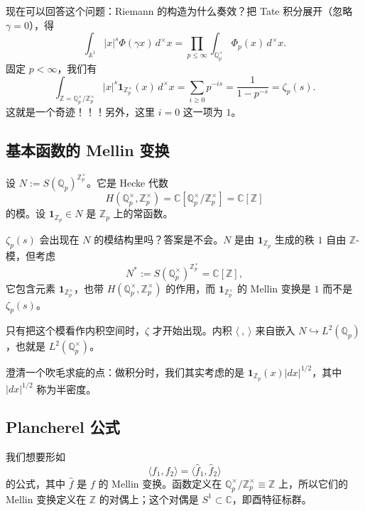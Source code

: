 现在可以回答这个问题：Riemann 的构造为什么奏效？把 Tate 积分展开（忽略 $\gamma=0$），得
\begin{equation}
  \int_{\mathbb A^1}|x|^s\Phi(\gamma x)\,d^\times x=\prod_{p\le\infty}\int_{\mathbb Q_p^\times}\Phi_p(x)\,d^\times x.
  \label{eq:5-16}
\end{equation}
固定 $p<\infty$，我们有
\begin{equation}
  \int_{\mathbb Z=\mathbb Q_p^\times/\mathbb Z_p^\times}|x|^s\mathbf 1_{\mathbb Z_p^\times}(x)\,d^\times x=\sum_{i\ge0}p^{-is}=\frac{1}{1-p^{-s}}=\zeta_p(s).
  \label{eq:5-17}
\end{equation}
这就是一个奇迹！！！另外，这里 $i=0$ 这一项为 $1$。

\subsection{基本函数的 Mellin 变换}

设 $N:=S(\mathbb Q_p)^{\mathbb Z_p^\times}$。它是 Hecke 代数
\[
  H(\mathbb Q_p^\times,\mathbb Z_p^\times)=\mathbb C[\mathbb Q_p^\times/\mathbb Z_p^\times]=\mathbb C[\mathbb Z]
\]
的模。设 $\mathbf 1_{\mathbb Z_p}\in N$ 是 $\mathbb Z_p$ 上的常函数。

$\zeta_p(s)$ 会出现在 $N$ 的模结构里吗？答案是不会。$N$ 是由 $\mathbf 1_{\mathbb Z_p}$ 生成的秩 $1$ 自由 $\mathbb Z$-模，但考虑
\[
  N^*:=S(\mathbb Q_p^\times)^{\mathbb Z_p^\times}=\mathbb C[\mathbb Z],
\]
它包含元素 $\mathbf 1_{\mathbb Z_p^\times}$，也带 $H(\mathbb Q_p^\times,\mathbb Z_p^\times)$ 的作用，而 $\mathbf 1_{\mathbb Z_p^\times}$ 的 Mellin 变换是 $1$ 而不是 $\zeta_p(s)$。

只有把这个模看作内积空间时，$\zeta$ 才开始出现。内积 $\langle\ ,\ \rangle$ 来自嵌入 $N\hookrightarrow L^2(\mathbb Q_p)$，也就是 $L^2(\mathbb Q_p^\times)$。

澄清一个吹毛求疵的点：做积分时，我们其实考虑的是 $\mathbf 1_{\mathbb Z_p}(x)|dx|^{1/2}$，其中 $|dx|^{1/2}$ 称为半密度。

\subsection{Plancherel 公式}

我们想要形如
\begin{equation}
  \langle f_1,f_2\rangle=\langle\hat f_1,\hat f_2\rangle
  \label{eq:5-18}
\end{equation}
的公式，其中 $\hat f$ 是 $f$ 的 Mellin 变换。函数定义在 $\mathbb Q_p^\times/\mathbb Z_p^\times\equiv\mathbb Z$ 上，所以它们的 Mellin 变换定义在 $\mathbb Z$ 的对偶上；这个对偶是 $S^1\subset\mathbb C$，即酉特征标群。

